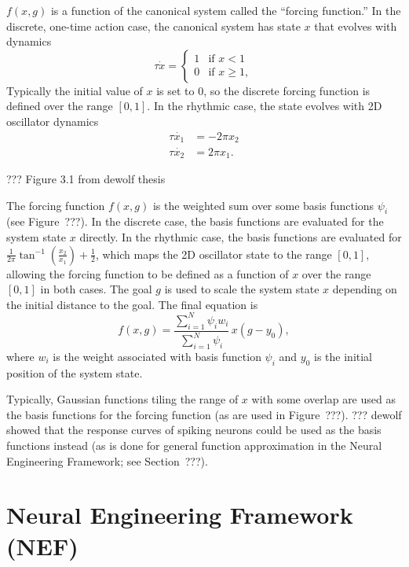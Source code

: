 $f(x, g)$ is a function
of the canonical system
called the ``forcing function.''
In the discrete, one-time action case,
the canonical system
has state $x$ that evolves
with dynamics
\begin{equation}
  \label{dmp-discrete}
  \tau\dot{x} =
  \begin{cases}
    1 &\text{if } x < 1 \\
    0 &\text{if } x \ge 1,
  \end{cases}
\end{equation}
Typically the initial value of $x$
is set to 0,
so the discrete forcing function
is defined over the range $[0, 1]$.
In the rhythmic case,
the state evolves with
2D oscillator dynamics
\begin{align}
  \tau \dot{x_1} &= -2 \pi x_2 \nonumber \\
  \tau \dot{x_2} &= 2 \pi x_1.
  \label{dmp-rhythmic}
\end{align}

??? Figure 3.1 from dewolf thesis

The forcing function $f(x, g)$ is
the weighted sum
over some basis functions
$\psi_i$
(see Figure~???).
In the discrete case,
the basis functions are evaluated
for the system state $x$ directly.
In the rhythmic case,
the basis functions are evaluated
for $\frac{1}{2\pi}\tan^{-1}\left(\frac{x_2}{x_1}\right) + \frac{1}{2}$,
which maps the 2D oscillator state
to the range $[0, 1]$,
allowing the forcing function to be defined
as a function of $x$ over the range $[0, 1]$
in both cases.
The goal $g$ is used
to scale the system state $x$ depending on
the initial distance to the goal.
The final equation is
\begin{equation}
  \label{dmp-forcing-func}
  f(x, g) = \frac{\sum_{i=1}^N \psi_i w_i}{\sum_{i=1}^N \psi_i} \, x(g - y_0),
\end{equation}
where $w_i$ is the weight associated with
basis function $\psi_i$ and $y_0$
is the initial position of
the system state.

Typically, Gaussian functions
tiling the range of $x$ with some overlap
are used as the basis functions
for the forcing function
(as are used in Figure~???).
??? dewolf showed that
the response curves of spiking neurons
could be used as the
basis functions instead
(as is done for general function approximation
in the Neural Engineering Framework;
see Section~???).

\section{Neural Engineering Framework (NEF)}

